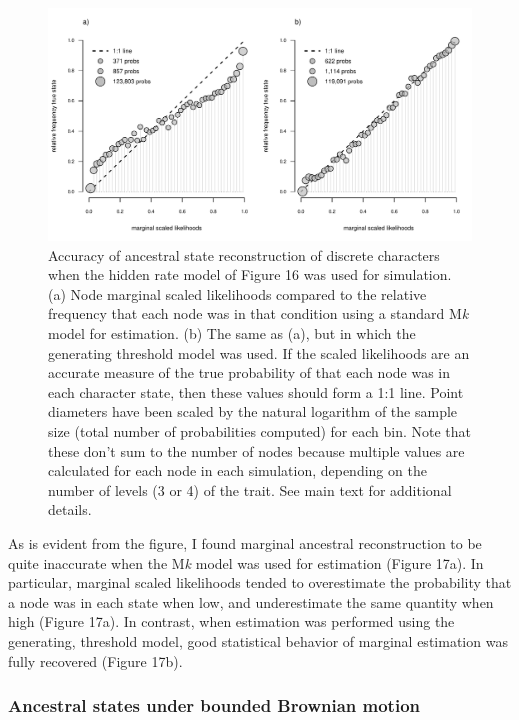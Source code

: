 \documentclass{article}
\begin{document}
\begin{figure}
\includegraphics[width=1\linewidth]{Revell.AncestralReconstruction_files/figure-latex/fig17-1} \caption{Accuracy of ancestral state reconstruction of discrete characters when the hidden rate model of Figure 16 was used for simulation. (a) Node marginal scaled likelihoods compared to the relative frequency that each node was in that condition using a standard M\emph{k} model for estimation. (b) The same as (a), but in which the generating threshold model was used. If the scaled likelihoods are an accurate measure of the true probability of that each node was in each character state, then these values should form a 1:1 line. Point diameters have been scaled by the natural logarithm of the sample size (total number of probabilities computed) for each bin. Note that these don't sum to the number of nodes because multiple values are calculated for each node in each simulation, depending on the number of levels (3 or 4) of the trait. See main text for additional details.}\label{fig:fig17}
\end{figure}

As is evident from the figure, I found marginal ancestral reconstruction to be quite inaccurate when the M\emph{k} model was used for estimation (Figure 17a). In particular, marginal scaled likelihoods tended to overestimate the probability that a node was in each state when low, and underestimate the same quantity when high (Figure 17a). In contrast, when estimation was performed using the generating, threshold model, good statistical behavior of marginal estimation was fully recovered (Figure 17b).

\subsubsection{Ancestral states under bounded Brownian motion}\label{ancestral-states-under-bounded-brownian-motion}
\end{document}
